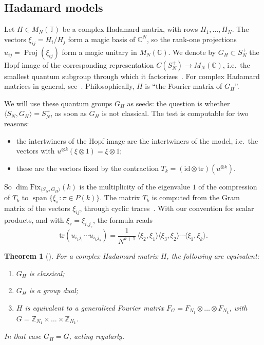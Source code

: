 \documentclass[11pt]{amsart}
\newtheorem{theorem}{Theorem}[section]
\theoremstyle{definition}
\theoremstyle{remark}
\theoremstyle{plain}
\numberwithin{equation}{section}
\numberwithin{table}{section}
\newcommand{\C}{\mathbb C}
\newcommand{\Z}{\mathbb Z}
\newcommand{\T}{\mathbb T}
\newcommand{\Fix}{\mathrm{Fix}}
\DeclareMathOperator{\spn}{span}
\DeclareMathOperator{\Proj}{Proj}
\begin{document}
\subsection{Hadamard models}\label{sec:hadmodels}

Let $H\in M_N(\T)$ be a complex Hadamard matrix, with rows $H_1,\dots,H_N$. The vectors $\xi_{ij}=H_i/H_j$ form a magic basis of $\C^N$, so the rank-one projections $u_{ij}=\Proj(\xi_{ij})$ form a magic unitary in $M_N(\C)$. We denote by $G_H\subset S_N^+$ the Hopf image of the corresponding representation $C(S_N^+)\to M_N(\C)$, i.e.\ the smallest quantum subgroup through which it factorizes~\cite{bqp,bbs}. For complex Hadamard matrices in general, see~\cite{tz}. Philosophically, $H$ is ``the Fourier matrix of $G_H$''.

We will use these quantum groups $G_H$ as seeds: the question is whether $\langle S_N,G_H\rangle=S_N^+$, as soon as $G_H$ is not classical. The test is computable for two reasons:
\begin{itemize}
\item the intertwiners of the Hopf image are the intertwiners of the model, i.e.\ the vectors with $u^{\otimes k}(\xi\otimes1)=\xi\otimes1$;
\item these are the vectors fixed by the contraction $T_k=(\mathrm{id}\otimes\mathrm{tr})(u^{\otimes k})$.
\end{itemize}
So $\dim\Fix_{\langle S_N,G_H\rangle}(k)$ is the multiplicity of the eigenvalue $1$ of the compression of $T_k$ to $\spn\{\xi_\pi:\pi\in P(k)\}$. The matrix $T_k$ is computed from the Gram matrix of the vectors $\xi_{ij}$, through cyclic traces~\cite[Thm.~6.5]{bbs}. With our convention for scalar products, and with $\xi_r=\xi_{i_rj_r}$, the formula reads
\[
\mathrm{tr}(u_{i_1j_1}\cdots u_{i_kj_k})=\frac{1}{N^{k+1}}\,\langle\xi_2,\xi_1\rangle\langle\xi_3,\xi_2\rangle\cdots\langle\xi_1,\xi_k\rangle .
\]

\begin{theorem}[{\cite[Thm.~6.4]{bbs}}]\label{thm:classical}
For a complex Hadamard matrix $H$, the following are equivalent:
\begin{enumerate}
\item $G_H$ is classical;
\item $G_H$ is a group dual;
\item $H$ is equivalent to a generalized Fourier matrix $F_G=F_{N_1}\otimes\dots\otimes F_{N_k}$, with $G=\Z_{N_1}\times\dots\times\Z_{N_k}$.
\end{enumerate}
In that case $G_H=G$, acting regularly.
\end{theorem}
\end{document}
